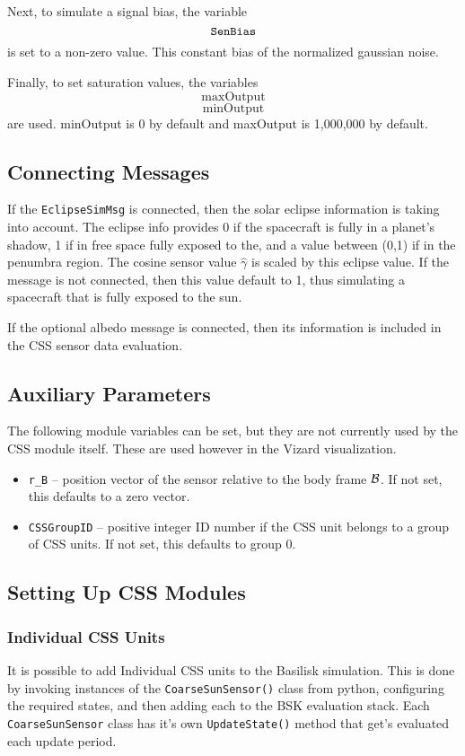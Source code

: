 Next, to simulate a signal bias, the variable
$$
	{\tt SenBias}
$$
is set to a non-zero value.   This constant bias of the normalized gaussian noise.  

Finally, to set saturation values, the variables
$$
	\mathrm{maxOutput}
	$$
	$$
	\mathrm{minOutput}
$$
are used. minOutput is  0 by default and maxOutput is 1,000,000 by default.

\subsection{Connecting Messages}
If the {\tt EclipseSimMsg} is connected, then the solar eclipse information is taking into account.  The eclipse info provides 0 if the spacecraft is fully in a planet's shadow, 1 if in free space fully exposed to the, and a value between (0,1) if in the penumbra region.  The cosine sensor value $\hat\gamma$ is scaled by this eclipse value.  If the message is not connected, then this value default to 1, thus simulating a spacecraft that is fully exposed to the sun.  

If the optional albedo message is connected, then its information is included in the CSS sensor data evaluation.

\subsection{Auxiliary Parameters}
The following module variables can be set, but they are not currently used by the CSS module itself.  These are used however in the Vizard visualization.  
\begin{itemize}
	\item {\tt r\_B} -- position vector of the sensor relative to the body frame $\cal B$.  If not set, this defaults to a zero vector.
	\item {\tt CSSGroupID} -- positive integer ID number if the CSS unit belongs to a group of CSS units.  If not set, this defaults to group 0.
\end{itemize}


\subsection{Setting Up CSS Modules}
\subsubsection{Individual CSS Units}
It is possible to add Individual CSS units to the Basilisk simulation.   This is done by invoking instances of the {\tt CoarseSunSensor()} class from python, configuring the required states, and then adding each to the BSK evaluation stack.  Each {\tt CoarseSunSensor} class has it's own {\tt UpdateState()} method that get's evaluated each update period.  

